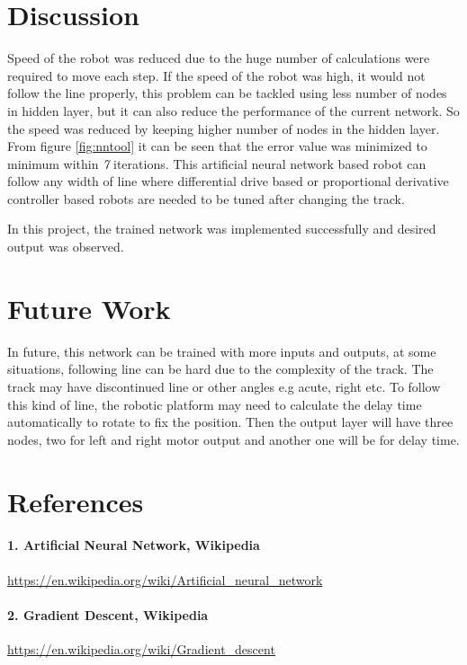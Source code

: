 \documentclass[14pt,a4paper]{extarticle}
\begin{document}
	
\section{Discussion}


	Speed of the robot was reduced due to the huge number of calculations were required to move each step. If the speed of the robot was high, it would not follow the line properly, this problem can be tackled using less number of nodes in hidden layer, but it can also reduce the performance of the current network. So the speed was reduced by keeping higher number of nodes in the hidden layer. From figure \ref{fig:nntool} it can be seen that the error value was minimized to minimum within \textit{7} iterations. This artificial neural network based robot can follow any width of line where differential drive based or proportional derivative controller based robots are needed to be tuned after changing the track. 
	
	In this project, the trained network was implemented successfully and desired output was observed.
	
\section{Future Work}

In future, this network can be trained with more inputs and outputs, at some situations, following line can be hard due to the complexity of the track. The track may have discontinued line or other angles e.g acute, right etc. To follow this kind of line, the robotic platform may need to calculate the delay time automatically to rotate to fix the position. Then the output layer will have three nodes, two for left and right motor output and another one will be for delay time. 


\section{References}

\paragraph{1. Artificial Neural Network, Wikipedia}
 \url{https://en.wikipedia.org/wiki/Artificial_neural_network}

\paragraph{2. Gradient Descent, Wikipedia} 
\url{https://en.wikipedia.org/wiki/Gradient_descent}
\end{document}
